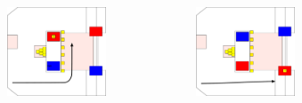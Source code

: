 \documentclass{beamer}
\begin{document}
\begin{frame}
\begin{columns}
\begin{figure}
  \end{figure}
  \begin{figure}
   \includegraphics[scale=0.15]{assets/paths/32_LL}
  \end{figure}
  \begin{figure}
   \includegraphics[scale=0.15]{assets/paths/32_RR}
  \end{figure}
 \end{columns}
\end{frame}
\end{document}
